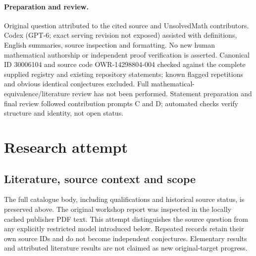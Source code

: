 \documentclass[11pt]{article}
\begin{document}
\paragraph{Preparation and review.}
Original question attributed to the cited source and UnsolvedMath contributors. Codex (GPT-6; exact serving revision not exposed) assisted with definitions, English summaries, source inspection and formatting. No new human mathematical authorship or independent proof verification is asserted. Canonical ID 30006104 and source code OWR-14298804-004 checked against the complete supplied registry and existing repository statements; known flagged repetitions and obvious identical conjectures excluded. Full mathematical-equivalence/literature review has not been performed. Statement preparation and final review followed contribution prompts C and D; automated checks verify structure and identity, not open status.
\label{end:30006104}

\section{Research attempt}
\subsection{Literature, source context and scope}
The full catalogue body, including qualifications and historical source status, is preserved above. The original workshop report was inspected in the locally cached publisher PDF text. This attempt distinguishes the source question from any explicitly restricted model introduced below. Repeated records retain their own source IDs and do not become independent conjectures. Elementary results and attributed literature results are not claimed as new original-target progress.
\end{document}
